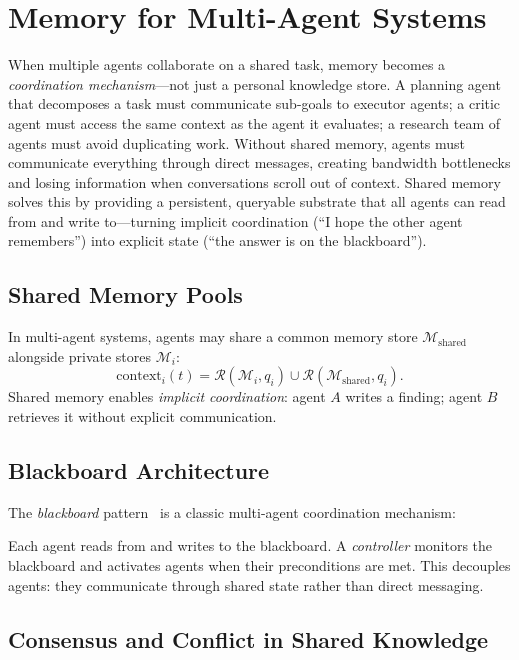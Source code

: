 \section{Memory for Multi-Agent Systems}
\label{sec:memory-multiagent}

When multiple agents collaborate on a shared task, memory becomes a \emph{coordination mechanism}---not just a personal knowledge store. A planning agent that decomposes a task must communicate sub-goals to executor agents; a critic agent must access the same context as the agent it evaluates; a research team of agents must avoid duplicating work. Without shared memory, agents must communicate everything through direct messages, creating bandwidth bottlenecks and losing information when conversations scroll out of context. Shared memory solves this by providing a persistent, queryable substrate that all agents can read from and write to---turning implicit coordination (``I hope the other agent remembers'') into explicit state (``the answer is on the blackboard'').

\subsection{Shared Memory Pools}
\label{shared-memory-pools}

In multi-agent systems, agents may share a common memory store $\mathcal{M}_\text{shared}$ alongside private stores $\mathcal{M}_i$: 
\[
\text{context}_i(t) = \mathcal{R}(\mathcal{M}_i, q_i) \cup \mathcal{R}(\mathcal{M}_\text{shared}, q_i).
\]
 Shared memory enables \emph{implicit coordination}: agent $A$ writes a finding; agent $B$ retrieves it without explicit communication.

\subsection{Blackboard Architecture}
\label{blackboard-architecture}

The \emph{blackboard} pattern~\cite{hayes1985blackboard} is a classic multi-agent coordination mechanism:

Each agent reads from and writes to the blackboard. A \emph{controller} monitors the blackboard and activates agents when their preconditions are met. This decouples agents: they communicate through shared state rather than direct messaging.

\subsection{Consensus and Conflict in Shared Knowledge}
\label{consensus-and-conflict-in-shared-knowledge}

